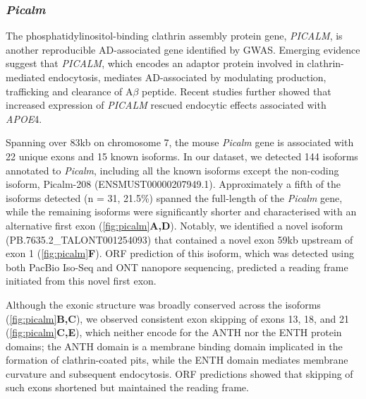 \newpage
\subsubsection{\textit{Picalm}}
The phosphatidylinositol-binding clathrin assembly protein gene, \textit{PICALM}, is another reproducible AD-associated gene identified by GWAS. Emerging evidence suggest that \textit{PICALM}, which encodes an adaptor protein involved in clathrin-mediated endocytosis,  mediates AD-associated by modulating production, trafficking and clearance of A$\beta$ peptide\cite{Ando2016}. Recent studies further showed that increased expression of \textit{PICALM} rescued endocytic effects associated with \textit{APOE}4\cite{Narayan2020}.

Spanning over 83kb on chromosome 7, the mouse \textit{Picalm} gene is associated with 22 unique exons and 15 known isoforms. In our dataset, we detected 144 isoforms annotated to \textit{Picalm}, including all the known isoforms except the non-coding isoform, Picalm-208 (ENSMUST00000207949.1). Approximately a fifth of the isoforms detected (n = 31, 21.5\%) spanned the full-length of the \textit{Picalm} gene, while the remaining isoforms were significantly shorter and characterised with an alternative first exon (\cref{fig:picalm}\textbf{A,D}). Notably, we identified a novel isoform (PB.7635.2\_TALONT001254093) that contained a novel exon 59kb upstream of exon 1 (\cref{fig:picalm}\textbf{F}). ORF prediction of this isoform, which was detected using both PacBio Iso-Seq and ONT nanopore sequencing, predicted a reading frame initiated from this novel first exon.  

Although the exonic structure was broadly conserved across the isoforms (\cref{fig:picalm}\textbf{B,C}), we observed consistent exon skipping of exons 13, 18, and 21 (\cref{fig:picalm}\textbf{C,E}), which neither encode for the ANTH nor the ENTH protein domains; the ANTH domain is a membrane binding domain implicated in the formation of clathrin-coated pits, while the ENTH domain mediates membrane curvature and subsequent endocytosis. ORF predictions showed that skipping of such exons shortened but maintained the reading frame. 


